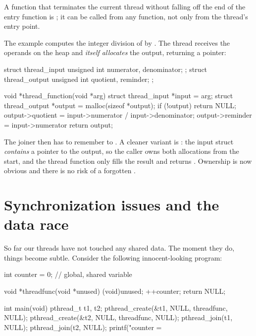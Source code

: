 A function that terminates the current thread without falling off the end of the entry function is ; it can be called from any function, not only from the thread's entry point.

\begin{exampleblock}
The example  computes the integer division of  by . The thread receives the operands on the heap and \emph{itself allocates} the output, returning a pointer:

\begin{codeblock}[language=C]
struct thread_input  { unsigned int numerator, denominator; };
struct thread_output { unsigned int quotient,  reminder;    };

void *thread_function(void *arg) {
    struct thread_input  *input  = arg;
    struct thread_output *output = malloc(sizeof *output);
    if (!output) return NULL;
    output->quotient = input->numerator / input->denominator;
    output->reminder = input->numerator %
    return output;
}
\end{codeblock}

The joiner then has to remember to . A cleaner variant is : the input struct \emph{contains} a pointer to the output, so the caller owns both allocations from the start, and the thread function only fills the result and returns . Ownership is now obvious and there is no risk of a forgotten .
\end{exampleblock}

\section{Synchronization issues and the data race}

So far our threads have not touched any shared data. The moment they do, things become subtle. Consider the following innocent-looking program:

\begin{codeblock}[language=C]
int counter = 0;             // global, shared variable

void *threadfunc(void *unused) {
    (void)unused;
    ++counter;
    return NULL;
}

int main(void) {
    pthread_t t1, t2;
    pthread_create(&t1, NULL, threadfunc, NULL);
    pthread_create(&t2, NULL, threadfunc, NULL);
    pthread_join(t1, NULL);
    pthread_join(t2, NULL);
    printf("counter = %
}
\end{codeblock}

